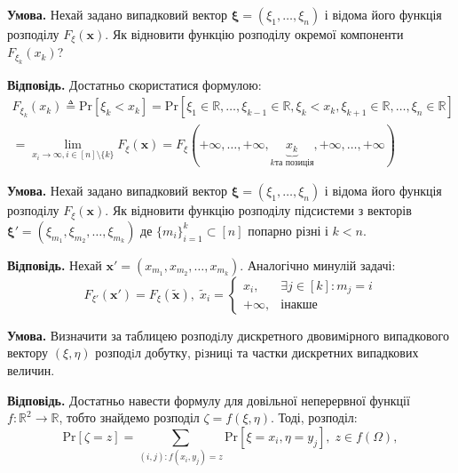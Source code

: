 \documentclass[oneside,solution]{karazin-prob-theory-assign}
\begin{document}

\hspace{20px}\textbf{Умова.} Нехай задано випадковий вектор $\boldsymbol{\xi} = (\xi_1,\dots,\xi_n)$ і відома його функція розподілу $F_{\xi}(\mathbf{x})$. Як відновити функцію розподілу окремої компоненти $F_{\xi_k}(x_k)$?

\textbf{Відповідь.} Достатньо скористатися формулою:
\begin{gather}
    F_{\xi_k}(x_k) \triangleq \text{Pr}[\xi_k < x_k] = \text{Pr}[\xi_1 \in \mathbb{R},\dots,\xi_{k-1} \in \mathbb{R}, \xi_k < x_k, \xi_{k+1} \in \mathbb{R},\dots,\xi_n \in \mathbb{R}] \nonumber \\
    = \lim_{x_i \to \infty, i \in [n] \setminus \{k\}} F_{\xi}(\mathbf{x}) = F_{\xi}(+\infty,\dots,+\infty, \underbrace{x_k}_{\text{$k$та позиція}}, +\infty,\dots,+\infty)
\end{gather}


\hspace{20px}\textbf{Умова.} Нехай задано випадковий вектор $\boldsymbol{\xi} = (\xi_1,\dots,\xi_n)$ і відома його функція розподілу $F_{\xi}(\mathbf{x})$. Як відновити функцію розподілу підсистеми з векторів $\boldsymbol{\xi}' = (\xi_{m_1},\xi_{m_2},\dots,\xi_{m_k})$ де $\{m_i\}_{i=1}^k \subset [n]$ попарно різні і $k < n$. 

\textbf{Відповідь.} Нехай $\mathbf{x}'=(x_{m_1},x_{m_2},\dots,x_{m_k})$. Аналогічно минулій задачі:
\begin{equation}
    F_{\xi'}(\mathbf{x}') = F_{\xi}(\widetilde{\mathbf{x}}), \;\widetilde{x}_i = \begin{cases}
        x_i, & \exists j \in [k]: m_j = i \\
        +\infty, & \text{інакше}
    \end{cases}
\end{equation}


\hspace{20px}\textbf{Умова.} Визначити за таблицею розподiлу дискретного двовимiрного випадкового вектору $(\xi,\eta)$ розподiл добутку, рiзницi та частки дискретних випадкових величин.

\textbf{Відповідь.} Достатньо навести формулу для довільної неперервної функції $f: \mathbb{R}^2 \to \mathbb{R}$, тобто знайдемо розподіл $\zeta = f(\xi,\eta)$. Тоді, розподіл:
\begin{equation}
    \text{Pr}[\zeta = z] = \sum_{(i,j): f(x_i,y_j) = z} \text{Pr}[\xi = x_i, \eta = y_j], \; z \in f(\Omega),
\end{equation}
\end{document}
